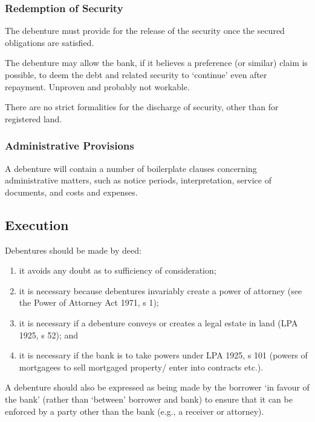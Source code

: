 \documentclass[
]{article}
\providecommand{\tightlist}{%
  \setlength{\itemsep}{0pt}\setlength{\parskip}{0pt}}
\begin{document}
\hypertarget{redemption-of-security}{%
\subsubsection{Redemption of Security}\label{redemption-of-security}}

The debenture must provide for the release of the security once the
secured obligations are satisfied.

The debenture may allow the bank, if it believes a preference (or
similar) claim is possible, to deem the debt and related security to
`continue' even after repayment. Unproven and probably not workable.

There are no strict formalities for the discharge of security, other
than for registered land.

\hypertarget{administrative-provisions}{%
\subsubsection{Administrative
Provisions}\label{administrative-provisions}}

A debenture will contain a number of boilerplate clauses concerning
administrative matters, such as notice periods, interpretation, service
of documents, and costs and expenses.

\hypertarget{execution}{%
\subsection{Execution}\label{execution}}

Debentures should be made by deed:

\begin{enumerate}
\tightlist
\item
  it avoids any doubt as to sufficiency of consideration;
\item
  it is necessary because debentures invariably create a power of
  attorney (see the Power of Attorney Act 1971, s 1);
\item
  it is necessary if a debenture conveys or creates a legal estate in
  land (LPA 1925, s 52); and
\item
  it is necessary if the bank is to take powers under LPA 1925, s 101
  (powers of mortgagees to sell mortgaged property/ enter into contracts
  etc.).
\end{enumerate}

A debenture should also be expressed as being made by the borrower `in
favour of the bank' (rather than `between' borrower and bank) to ensure
that it can be enforced by a party other than the bank (e.g., a receiver
or attorney).
\end{document}
